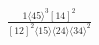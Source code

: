 \documentclass[varwidth, border=5pt]{standalone}
\begin{document}
\begin{my}
$\begin{gathered}
\scriptscriptstyle\frac{1⟨45⟩^3[14]^2}{[12]^2⟨15⟩⟨24⟩⟨34⟩^2}
\end{gathered}$
\end{my}
\end{document}
